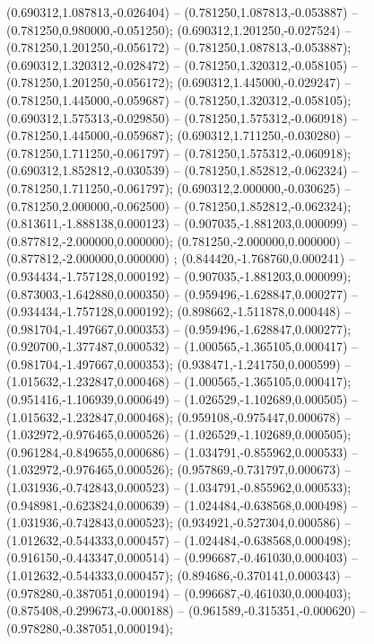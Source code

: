  (0.690312,1.087813,-0.026404) -- (0.781250,1.087813,-0.053887) -- (0.781250,0.980000,-0.051250);
 (0.690312,1.201250,-0.027524) -- (0.781250,1.201250,-0.056172) -- (0.781250,1.087813,-0.053887);
 (0.690312,1.320312,-0.028472) -- (0.781250,1.320312,-0.058105) -- (0.781250,1.201250,-0.056172);
 (0.690312,1.445000,-0.029247) -- (0.781250,1.445000,-0.059687) -- (0.781250,1.320312,-0.058105);
 (0.690312,1.575313,-0.029850) -- (0.781250,1.575312,-0.060918) -- (0.781250,1.445000,-0.059687);
 (0.690312,1.711250,-0.030280) -- (0.781250,1.711250,-0.061797) -- (0.781250,1.575312,-0.060918);
 (0.690312,1.852812,-0.030539) -- (0.781250,1.852812,-0.062324) -- (0.781250,1.711250,-0.061797);
 (0.690312,2.000000,-0.030625) -- (0.781250,2.000000,-0.062500) -- (0.781250,1.852812,-0.062324);
 (0.813611,-1.888138,0.000123) -- (0.907035,-1.881203,0.000099) -- (0.877812,-2.000000,0.000000);
 (0.781250,-2.000000,0.000000) -- (0.877812,-2.000000,0.000000) ;
 (0.844420,-1.768760,0.000241) -- (0.934434,-1.757128,0.000192) -- (0.907035,-1.881203,0.000099);
 (0.873003,-1.642880,0.000350) -- (0.959496,-1.628847,0.000277) -- (0.934434,-1.757128,0.000192);
 (0.898662,-1.511878,0.000448) -- (0.981704,-1.497667,0.000353) -- (0.959496,-1.628847,0.000277);
 (0.920700,-1.377487,0.000532) -- (1.000565,-1.365105,0.000417) -- (0.981704,-1.497667,0.000353);
 (0.938471,-1.241750,0.000599) -- (1.015632,-1.232847,0.000468) -- (1.000565,-1.365105,0.000417);
 (0.951416,-1.106939,0.000649) -- (1.026529,-1.102689,0.000505) -- (1.015632,-1.232847,0.000468);
 (0.959108,-0.975447,0.000678) -- (1.032972,-0.976465,0.000526) -- (1.026529,-1.102689,0.000505);
 (0.961284,-0.849655,0.000686) -- (1.034791,-0.855962,0.000533) -- (1.032972,-0.976465,0.000526);
 (0.957869,-0.731797,0.000673) -- (1.031936,-0.742843,0.000523) -- (1.034791,-0.855962,0.000533);
 (0.948981,-0.623824,0.000639) -- (1.024484,-0.638568,0.000498) -- (1.031936,-0.742843,0.000523);
 (0.934921,-0.527304,0.000586) -- (1.012632,-0.544333,0.000457) -- (1.024484,-0.638568,0.000498);
 (0.916150,-0.443347,0.000514) -- (0.996687,-0.461030,0.000403) -- (1.012632,-0.544333,0.000457);
 (0.894686,-0.370141,0.000343) -- (0.978280,-0.387051,0.000194) -- (0.996687,-0.461030,0.000403);
 (0.875408,-0.299673,-0.000188) -- (0.961589,-0.315351,-0.000620) -- (0.978280,-0.387051,0.000194);
